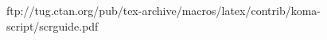 
ftp://tug.ctan.org/pub/tex-archive/macros/latex/contrib/koma-script/scrguide.pdf

\usepackage[%
automark,
komastyle,
nouppercase,
]{scrpage2}


\IfElseChapterDefined{%
\pagestyle{scrheadings} %
}{
\pagestyle{scrplain} %
}
%
\clearscrheadings
\clearscrplain
%
\IfElseChapterDefined{
\ohead{\pagemark}
\ihead{\headmark}
\ofoot[\pagemark]{} %
}{
\cfoot[\pagemark]{\pagemark} %
}


